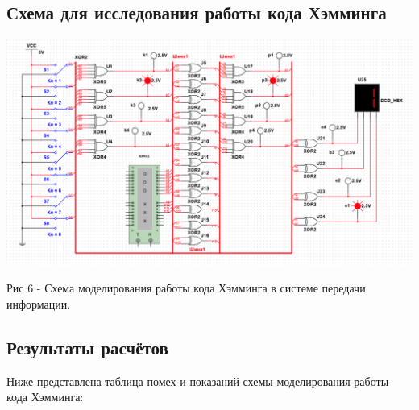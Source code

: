 \documentclass[14pt]{article}
\begin{document}
\subsection{Схема для исследования работы кода Хэмминга}
\includegraphics[width=1\linewidth]{img/scheme2.png}
\begin{center}
        Рис 6 - Схема моделирования работы кода Хэмминга в системе передачи информации.
\end{center}

\subsection{Результаты расчётов}
Ниже представлена таблица помех и показаний схемы моделирования работы кода Хэмминга:
\end{document}
